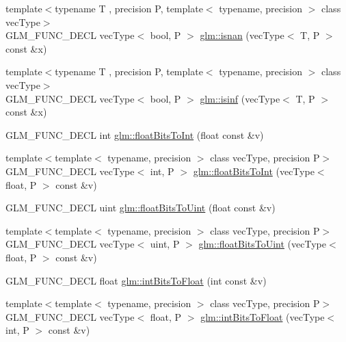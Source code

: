 \begin{DoxyCompactItemize}
\item 
{\footnotesize template$<$typename T , precision P, template$<$ typename, precision $>$ class vec\-Type$>$ }\\G\-L\-M\-\_\-\-F\-U\-N\-C\-\_\-\-D\-E\-C\-L vec\-Type$<$ bool, P $>$ \hyperlink{group__core__func__common_ga6cb8f202a52eed2331724a3800198ebf}{glm\-::isnan} (vec\-Type$<$ T, P $>$ const \&x)
\item 
{\footnotesize template$<$typename T , precision P, template$<$ typename, precision $>$ class vec\-Type$>$ }\\G\-L\-M\-\_\-\-F\-U\-N\-C\-\_\-\-D\-E\-C\-L vec\-Type$<$ bool, P $>$ \hyperlink{group__core__func__common_gaf28f7a4696746f081685c9fd05c7e2de}{glm\-::isinf} (vec\-Type$<$ T, P $>$ const \&x)
\item 
G\-L\-M\-\_\-\-F\-U\-N\-C\-\_\-\-D\-E\-C\-L int \hyperlink{group__core__func__common_ga1425c1c3160ec51214b03a0469a3013d}{glm\-::float\-Bits\-To\-Int} (float const \&v)
\item 
{\footnotesize template$<$template$<$ typename, precision $>$ class vec\-Type, precision P$>$ }\\G\-L\-M\-\_\-\-F\-U\-N\-C\-\_\-\-D\-E\-C\-L vec\-Type$<$ int, P $>$ \hyperlink{group__core__func__common_gac4a0710238ae54c67931dd29a0b0f873}{glm\-::float\-Bits\-To\-Int} (vec\-Type$<$ float, P $>$ const \&v)
\item 
G\-L\-M\-\_\-\-F\-U\-N\-C\-\_\-\-D\-E\-C\-L uint \hyperlink{group__core__func__common_ga70e0271c34af52f3100c7960e18c3f2b}{glm\-::float\-Bits\-To\-Uint} (float const \&v)
\item 
{\footnotesize template$<$template$<$ typename, precision $>$ class vec\-Type, precision P$>$ }\\G\-L\-M\-\_\-\-F\-U\-N\-C\-\_\-\-D\-E\-C\-L vec\-Type$<$ uint, P $>$ \hyperlink{group__core__func__common_ga1804d4c443605d8a27be644aa461afe4}{glm\-::float\-Bits\-To\-Uint} (vec\-Type$<$ float, P $>$ const \&v)
\item 
G\-L\-M\-\_\-\-F\-U\-N\-C\-\_\-\-D\-E\-C\-L float \hyperlink{group__core__func__common_ga4fb7c21c2dce064b26fd9ccdaf9adcd4}{glm\-::int\-Bits\-To\-Float} (int const \&v)
\item 
{\footnotesize template$<$template$<$ typename, precision $>$ class vec\-Type, precision P$>$ }\\G\-L\-M\-\_\-\-F\-U\-N\-C\-\_\-\-D\-E\-C\-L vec\-Type$<$ float, P $>$ \hyperlink{group__core__func__common_gad21ab176dd0e6b59d923db5efca87f4e}{glm\-::int\-Bits\-To\-Float} (vec\-Type$<$ int, P $>$ const \&v)
\item 

\end{DoxyCompactItemize}
